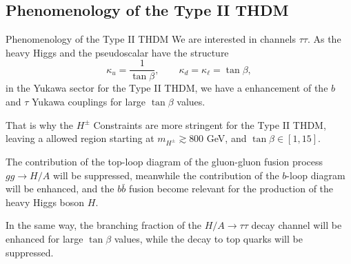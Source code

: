 \documentclass{../bredelebeamer}
\begin{document}
\subsection{Phenomenology of the Type II THDM}
\begin{frame}{Phenomenology of the Type II THDM}
    We are interested in channels $\tau \tau$. As the heavy Higgs and the pseudoscalar have the structure
    $$
    \kappa_u=\frac{1}{\tan\beta}, \qquad \kappa_d=\kappa_\ell=\tan\beta,
    $$
    in the Yukawa sector for the Type II THDM, we have a enhancement of the $b$ and $\tau$ Yukawa couplings for large $\tan\beta$ values.\vfill

    That is why the {$H^\pm$ Constraints} are more stringent for the Type II THDM, leaving a allowed region starting at $m_{H^\pm} \gtrsim 800$ GeV, and $\tan\beta \in [1, 15]$.\vfill

    The contribution of the top-loop diagram of the gluon-gluon fusion process $gg \rightarrow H / A$ will be suppressed, meanwhile the contribution of the $b$-loop diagram will be enhanced, and the $b\bar b$ fusion become relevant for the production of the heavy Higgs boson $H$. 
    \vfill

    In the same way, the branching fraction of the $H/A \rightarrow \tau \tau$ decay channel will be enhanced for large $\tan\beta$ values, while the decay to top quarks will be suppressed.
\end{frame}
\end{document}
